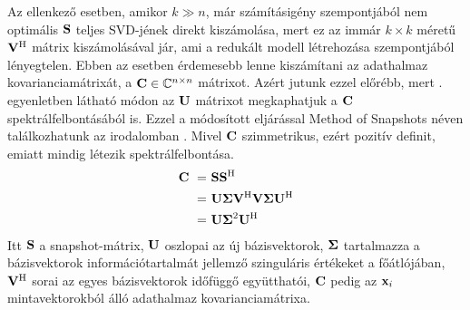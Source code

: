             \par
            Az ellenkező esetben, amikor $k\gg n$, már számításigény szempontjából nem optimális ${\bf S}$ teljes SVD-jének direkt kiszámolása, mert ez az immár $k \times k$ méretű ${\bf V^{\mathrm{H}}}$ mátrix kiszámolásával jár, ami a redukált modell létrehozása szempontjából lényegtelen. Ebben az esetben érdemesebb lenne kiszámítani az adathalmaz kovarianciamátrixát, a ${\bf C} \in \mathbb{C}^{n \times n}$ mátrixot. Azért jutunk ezzel előrébb, mert . egyenletben látható módon az ${\bf U}$ mátrixot megkaphatjuk a ${\bf C}$ spektrálfelbontásából is. Ezzel a módosított eljárással Method of Snapshots néven találkozhatunk az irodalomban \cite{Chatterjee00}. Mivel ${\bf C}$ szimmetrikus, ezért pozitív definit, emiatt mindig létezik spektrálfelbontása.
            \begin{align}
            \begin{split}
                \label{equ:kovariancia}
                {\bf C}~=&~{\bf S S^{\mathrm{H}}} \\
                =&~{\bf U \Sigma V^{\mathrm{H}} V\Sigma U^{\mathrm{H}}} \\
                =&~{\bf U \Sigma}^2{\bf U^{\mathrm{H}}}
            \end{split}
            \end{align}
            Itt ${\bf S}$ a snapshot-mátrix, ${\bf U}$ oszlopai az új bázisvektorok, ${\bf \Sigma}$ tartalmazza a bázisvektorok információtartalmát jellemző szinguláris értékeket a főátlójában, ${\bf V^{\mathrm{H}}}$ sorai az egyes bázisvektorok időfüggő együtthatói, ${\bf C}$ pedig az ${\bf x}_i$ mintavektorokból álló adathalmaz kovarianciamátrixa.
